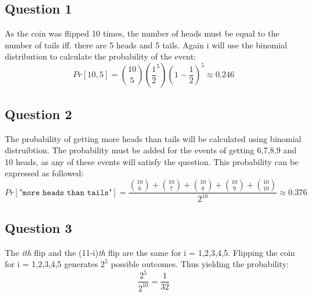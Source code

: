 \documentclass{article}
\begin{document}
\subsection{Question 1}
As the coin was flipped 10 times, the number of heads must be equal to the number of tails iff. there are 5 heads and 5 tails. Again i will use the binomial distribution to calculate the probability of the event:
$$
Pr[10,5] = \binom{10}{5} \left(\dfrac{1}{2}^5\right)\left(1-\dfrac{1}{2}\right)^5
\approx 0.246
$$
\subsection{Question 2}
The probability of getting more heads than tails will be calculated using binomial distruibtion. The probability must be added for the events of getting 6,7,8,9 and 10 heads, as any of these events will satisfy the question. This probability can be expressed as followed:
$$
Pr[\texttt{"more heads than tails"}] = \dfrac{\binom{10}{6} + \binom{10}{7} + \binom{10}{8} + \binom{10}{9} + \binom{10}{10}}{2^{10}} \approx 0.376
$$
\subsection{Question 3}
The \textit{ith} flip and the (11-i)\textit{th} flip are the same for i = 1,2,3,4,5. Flipping the coin for i = 1,2,3,4,5 generates $2^5$ possible outcomes. Thus yielding the probability:
$$
\dfrac{2^5}{2^{10}} = \dfrac{1}{32}
$$
\end{document}
